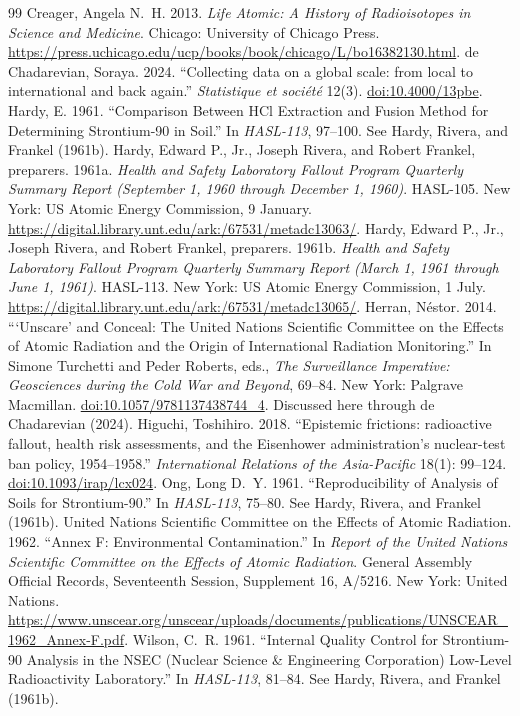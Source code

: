 \documentclass[11pt,a4paper]{article}
\begin{document}
\begin{thebibliography}{99}
 Creager, Angela N.~H. 2013. \textit{Life Atomic: A History of Radioisotopes in Science and Medicine}. Chicago: University of Chicago Press. \url{https://press.uchicago.edu/ucp/books/book/chicago/L/bo16382130.html}.
 de Chadarevian, Soraya. 2024. ``Collecting data on a global scale: from local to international and back again.'' \textit{Statistique et soci\'et\'e} 12(3). \href{https://doi.org/10.4000/13pbe}{doi:10.4000/13pbe}.
 Hardy, E. 1961. ``Comparison Between HCl Extraction and Fusion Method for Determining Strontium-90 in Soil.'' In \textit{HASL-113}, 97--100. See Hardy, Rivera, and Frankel (1961b).
 Hardy, Edward P., Jr., Joseph Rivera, and Robert Frankel, preparers. 1961a. \textit{Health and Safety Laboratory Fallout Program Quarterly Summary Report (September 1, 1960 through December 1, 1960)}. HASL-105. New York: US Atomic Energy Commission, 9 January. \url{https://digital.library.unt.edu/ark:/67531/metadc13063/}.
 Hardy, Edward P., Jr., Joseph Rivera, and Robert Frankel, preparers. 1961b. \textit{Health and Safety Laboratory Fallout Program Quarterly Summary Report (March 1, 1961 through June 1, 1961)}. HASL-113. New York: US Atomic Energy Commission, 1 July. \url{https://digital.library.unt.edu/ark:/67531/metadc13065/}.
 Herran, N\'estor. 2014. ```Unscare' and Conceal: The United Nations Scientific Committee on the Effects of Atomic Radiation and the Origin of International Radiation Monitoring.'' In Simone Turchetti and Peder Roberts, eds., \textit{The Surveillance Imperative: Geosciences during the Cold War and Beyond}, 69--84. New York: Palgrave Macmillan. \href{https://doi.org/10.1057/9781137438744_4}{doi:10.1057/9781137438744\_4}. Discussed here through de Chadarevian (2024).
 Higuchi, Toshihiro. 2018. ``Epistemic frictions: radioactive fallout, health risk assessments, and the Eisenhower administration's nuclear-test ban policy, 1954--1958.'' \textit{International Relations of the Asia-Pacific} 18(1): 99--124. \href{https://doi.org/10.1093/irap/lcx024}{doi:10.1093/irap/lcx024}.
 Ong, Long D.~Y. 1961. ``Reproducibility of Analysis of Soils for Strontium-90.'' In \textit{HASL-113}, 75--80. See Hardy, Rivera, and Frankel (1961b).
 United Nations Scientific Committee on the Effects of Atomic Radiation. 1962. ``Annex F: Environmental Contamination.'' In \textit{Report of the United Nations Scientific Committee on the Effects of Atomic Radiation}. General Assembly Official Records, Seventeenth Session, Supplement 16, A/5216. New York: United Nations. \url{https://www.unscear.org/unscear/uploads/documents/publications/UNSCEAR_1962_Annex-F.pdf}.
 Wilson, C.~R. 1961. ``Internal Quality Control for Strontium-90 Analysis in the NSEC (Nuclear Science \& Engineering Corporation) Low-Level Radioactivity Laboratory.'' In \textit{HASL-113}, 81--84. See Hardy, Rivera, and Frankel (1961b).
\end{thebibliography}
\end{document}
